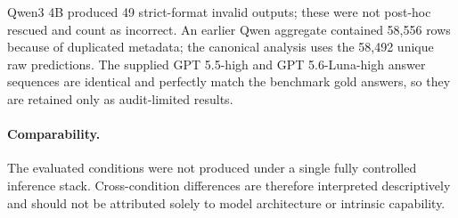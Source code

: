 Qwen3 4B produced 49 strict-format invalid outputs; these were not post-hoc rescued and count as incorrect. An earlier Qwen aggregate contained 58,556 rows because of duplicated metadata; the canonical analysis uses the 58,492 unique raw predictions. The supplied GPT 5.5-high and GPT 5.6-Luna-high answer sequences are identical and perfectly match the benchmark gold answers, so they are retained only as audit-limited results.

\FloatBarrier

\FloatBarrier

\paragraph{Comparability.}
The evaluated conditions were not produced under a single fully controlled inference stack. Cross-condition differences are therefore interpreted descriptively and should not be attributed solely to model architecture or intrinsic capability.
